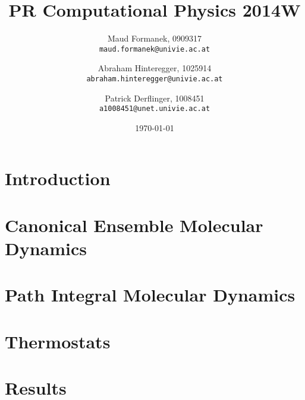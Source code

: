 \documentclass[a4paper]{article}
\title{PR Computational Physics 2014W}
\author{
	Maud Formanek, 0909317\\
    \texttt{maud.formanek@univie.ac.at}
	\and
    Abraham Hinteregger,  1025914\\
    \texttt{abraham.hinteregger@univie.ac.at}\and
    Patrick Derflinger,  1008451\\
    \texttt{a1008451@unet.univie.ac.at}
    }
\date{\today}
\begin{document}
\maketitle
\tableofcontents

\newpage

\section{Introduction} \label{intro}

\section{Canonical Ensemble Molecular Dynamics} \label{cemd}

\section{Path Integral Molecular Dynamics} \label{pimd}

\section{Thermostats} \label{thermostats}

\section{Results} \label{results}




%
%


\end{document}
